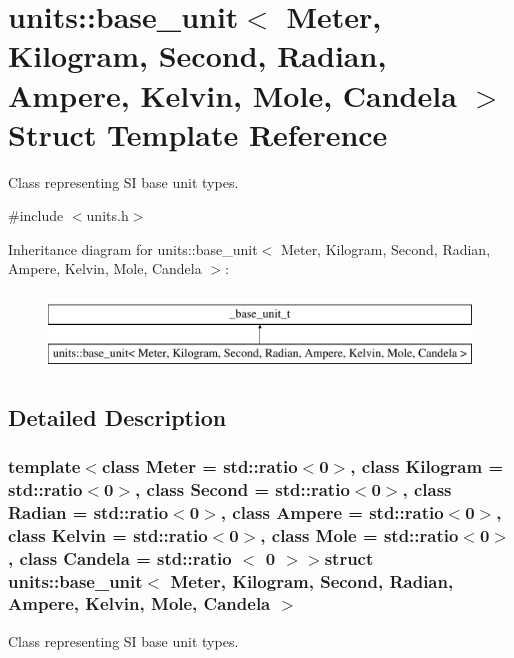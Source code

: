 \hypertarget{structunits_1_1base__unit}{}\section{units\+:\+:base\+\_\+unit$<$ Meter, Kilogram, Second, Radian, Ampere, Kelvin, Mole, Candela $>$ Struct Template Reference}
\label{structunits_1_1base__unit}


Class representing S\+I base unit types.  




{\ttfamily \#include $<$units.\+h$>$}

Inheritance diagram for units\+:\+:base\+\_\+unit$<$ Meter, Kilogram, Second, Radian, Ampere, Kelvin, Mole, Candela $>$\+:\begin{figure}[H]
\begin{center}
\leavevmode
\includegraphics[height=2.000000cm]{structunits_1_1base__unit}
\end{center}
\end{figure}


\subsection{Detailed Description}
\subsubsection*{template$<$class Meter = std\+::ratio$<$0$>$, class Kilogram = std\+::ratio$<$0$>$, class Second = std\+::ratio$<$0$>$, class Radian = std\+::ratio$<$0$>$, class Ampere = std\+::ratio$<$0$>$, class Kelvin = std\+::ratio$<$0$>$, class Mole = std\+::ratio$<$0$>$, class Candela = std\+::ratio $<$ 0 $>$$>$struct units\+::base\+\_\+unit$<$ Meter, Kilogram, Second, Radian, Ampere, Kelvin, Mole, Candela $>$}

Class representing S\+I base unit types. 

